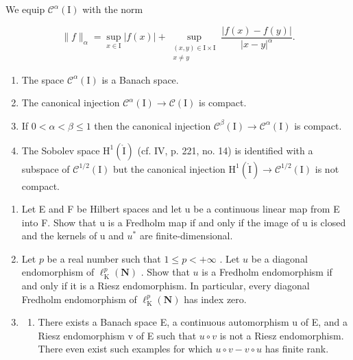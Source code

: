 We equip \(\mathcal{C}^{\alpha}(\mathrm{I})\) with the norm

\[
\| f\|_{\alpha} = \sup_{x\in \mathrm{I}}|f(x)| + \sup_{\substack{(x,y)\in \mathrm{I}\times \mathrm{I}\\ x\neq y}}\frac{|f(x) - f(y)|}{|x - y|^{\alpha}}.
\]

\begin{enumerate}
\def\labelenumi{\alph{enumi})}
\item
  The space \(\mathcal{C}^{\alpha}(\mathrm{I})\) is a Banach space.
\item
  The canonical injection \(\mathcal{C}^{\alpha}(\mathrm{I})\to \mathcal{C}(\mathrm{I})\) is compact.
\item
  If \(0 < \alpha < \beta \leqslant 1\) then the canonical injection \(\mathcal{C}^{\beta}(\mathrm{I}) \to \mathcal{C}^{\alpha}(\mathrm{I})\) is compact.\\
\item
  The Sobolev space \(\mathrm{H}^{1}(\mathring{\mathrm{I}})\) (cf. IV, p. 221, no. 14) is identified with a subspace of \(\mathcal{C}^{1/2}(\mathrm{I})\) but the canonical injection \(\mathrm{H}^{1}(\mathring{\mathrm{I}}) \to \mathcal{C}^{1/2}(\mathrm{I})\) is not compact.
\end{enumerate}

\exercisesection{}

\begin{enumerate}
\def\labelenumi{\arabic{enumi})}
\item
  Let E and F be Hilbert spaces and let u be a continuous linear map from E into F. Show that u is a Fredholm map if and only if the image of u is closed and the kernels of u and \(u^{*}\) are finite-dimensional.
\item
  Let \(p\) be a real number such that \(1 \leqslant p < +\infty\) . Let \(u\) be a diagonal endomorphism of \(\ell_{\mathrm{K}}^{p}(\mathbf{N})\) . Show that \(u\) is a Fredholm endomorphism if and only if it is a Riesz endomorphism. In particular, every diagonal Fredholm endomorphism of \(\ell_{\mathrm{K}}^{p}(\mathbf{N})\) has index zero.
\item
  \begin{enumerate}
  \def\labelenumii{\alph{enumii})}
  \tightlist
  \item
    There exists a Banach space E, a continuous automorphism u of E, and a Riesz endomorphism v of E such that \(u \circ v\) is not a Riesz endomorphism. There even exist such examples for which \(u \circ v - v \circ u\) has finite rank.
  \end{enumerate}
\end{enumerate}

